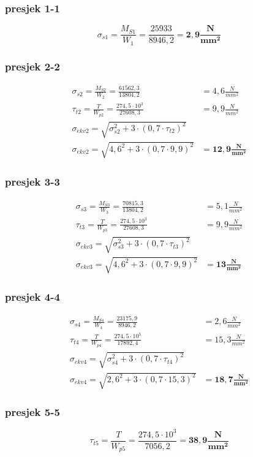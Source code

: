 \documentclass[11pt,a4paper]{article}
\begin{document}
\subsubsection*{presjek 1-1}
$$
\sigma_{s1}=\frac{M_{S1}}{W_1}=\frac{25933}{8946,2}=\mathbf{2,9\textstyle\frac{N}{mm^2}}
$$
\subsubsection*{presjek 2-2}
\begin{align*}
\sigma_{s2}=\frac{M_{S2}}{W_2}=\frac{61562,3}{13804,2}&=4,6\textstyle\frac{N}{mm^2}\\
\tau_{t2} =\frac{T}{W_{p2}}=\frac{274,5 \cdot 10^3}{27608,3}&=9,9\textstyle\frac{N}{mm^2}\\
\sigma_{ekv2}=\sqrt{\sigma_{s2}^2+3 \cdot (0,7 \cdot \tau_{t2})^2}\\
\sigma_{ekv2}=\sqrt{4,6^2+3 \cdot (0,7 \cdot 9,9)^2}&=\mathbf{12,9\textstyle\frac{N}{mm^2}}
\end{align*}
\subsubsection*{presjek 3-3}
\begin{align*}
\sigma_{s3}=\frac{M_{S3}}{W_3}=\frac{70815,3}{13804,2}&=5,1\textstyle\frac{N}{mm^2}\\
\tau_{t3} =\frac{T}{W_{p3}}=\frac{274,5 \cdot 10^3}{27608,3}&=9,9\textstyle\frac{N}{mm^2}\\
\sigma_{ekv3}=\sqrt{\sigma_{s3}^2+3 \cdot (0,7 \cdot \tau_{t3})^2}\\
\sigma_{ekv3}=\sqrt{4,6^2+3 \cdot (0,7 \cdot 9,9)^2}&=\mathbf{13 \textstyle \frac{N}{mm^2}}
\end{align*}
\subsubsection*{presjek 4-4}
\begin{align*}
\sigma_{s4}=\frac{M_{S4}}{W_4}=\frac{23175,9}{8946,2}&=2,6\textstyle\frac{N}{mm^2}\\
\tau_{t4} =\frac{T}{W_{p4}}=\frac{274,5 \cdot 10^3}{17892,4}&=15,3\textstyle\frac{N}{mm^2}\\
\sigma_{ekv4}=\sqrt{\sigma_{s4}^2+3 \cdot (0,7 \cdot \tau_{t4})^2}\\
\sigma_{ekv4}=\sqrt{2,6^2+3 \cdot (0,7 \cdot 15,3)^2}&=\mathbf{18,7 \textstyle\frac{N}{mm^2}}
\end{align*}
\subsubsection*{presjek 5-5}
$$
\tau_{t5} =\frac{T}{W_{p5}}=\frac{274,5 \cdot 10^3}{7056,2}=\mathbf{38,9\textstyle\frac{N}{mm^2}}
$$
\end{document}
